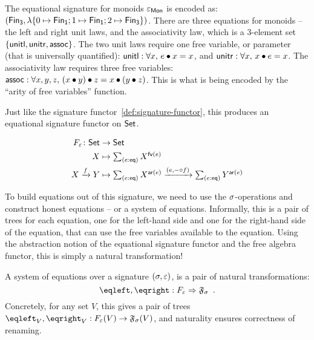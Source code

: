 \begin{example}
    The equational signature for monoids $\varepsilon_{\mathsf{Mon}}$ is encoded as:
    $(\Fin[3],\lambda \{0 \mapsto \Fin[1] ; 1 \mapsto \Fin[1] ; 2 \mapsto \Fin[3] \})$.
    There are three equations for monoids -- the left and right unit laws, and the associativity law,
    which is a 3-element set $\{ \operatorname{\mathsf{unitl}}, \operatorname{\mathsf{unitr}}, \operatorname{\mathsf{assoc}} \}$.
    The two unit laws require one free variable, or parameter (that is universally quantified):
    $\term{unitl} : \forall x,\, e \mult x \id x$, and $\term{unitr} : \forall x,\, x \mult e \id x$.
    The associativity law requires three free variables:
    $\term{assoc} : \forall x, y, z,\, (x \mult y) \mult z \id x \mult (y \mult z)$.
    This is what is being encoded by the ``arity of free variables'' function.
\end{example}

Just like the signature functor~\cref{def:signature-functor}, this produces an equational signature functor on $\mathsf{Set}$.
\begin{definition}
    \label{def:equational-signature-functor}
    \begin{align*}
        \EqSig \colon \Set & \to \Set                             \\
        X                  & \mapsto \dsum{e:\eqop}{X^{\eqfv(e)}} \\
        X \xto{f} Y        & \mapsto
        \dsum{e:\eqop}{X^{\ar(e)}}
        \xto{(e, \blank \comp f)}
        \dsum{e:\eqop}{Y^{\ar(e)}}
    \end{align*}
\end{definition}

To build equations out of this signature,
we need to use the $\sigma$-operations and construct honest equations -- or a system of equations.
%
Informally, this is a pair of trees for each equation,
one for the left-hand side and one for the right-hand side of the equation,
that can use the free variables available to the equation.
%
Using the abstraction notion of the equational signature functor and the free algebra functor,
this is simply a natural transformation!

\begin{definition}
    A system of equations over a signature $(\sigma,\varepsilon)$, is a pair of natural transformations:
    \[
        \eqleft, \eqright : \EqSig \natto \str{F}_{\sig} \enspace.
    \]
    Concretely, for any set $V$,
    this gives a pair of trees $\eqleft_{V}, \eqright_{V} : \EqSig(V) \to \str{F}_{\sig}(V)$,
    and naturality ensures correctness of renaming.
\end{definition}

